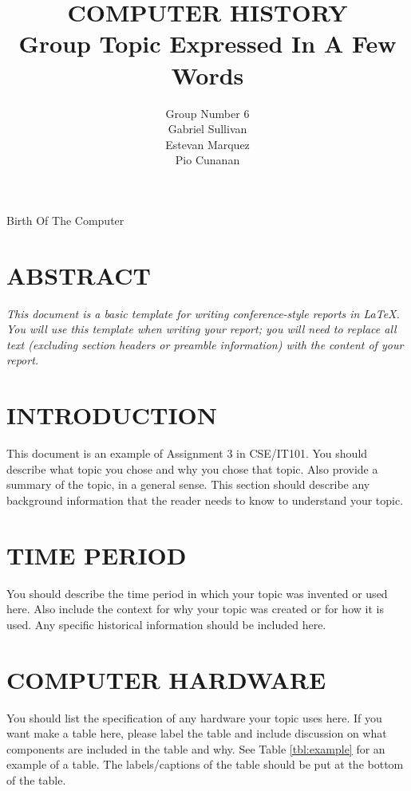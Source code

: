 \documentclass[letterpaper, 10 pt, conference]{IEEEconf}
\title{\LARGE \bf
COMPUTER HISTORY\\
\large Group Topic Expressed In A Few Words
}
\author{Group Number 6\\
\small Gabriel Sullivan\\
\small Estevan Marquez\\
\small Pio Cunanan\\
}
\begin{document}
\maketitle Birth Of The Computer
\thispagestyle{empty}
\pagestyle{empty}


\section*{ABSTRACT}
\textit{
This document is a basic template for writing conference-style
reports in LaTeX. You will use this template when writing
your report; you will need to replace all text (excluding
section headers or preamble information) with the content
of your report.
}

\section{INTRODUCTION}

This document is an example of Assignment 3 in CSE/IT101.
You should describe what topic you chose and
why you chose that topic. Also provide a summary of the
topic, in a general sense. This section should describe any
background information that the reader needs to know to
understand your topic.

\section{TIME PERIOD}

You should describe the time period in which your topic was
invented or used here. Also include the context for why your
topic was created or for how it is used. Any specific historical
information should be included here.

\section{COMPUTER HARDWARE}

You should list the specification of any hardware your topic
uses here. If you want make a table here, please label the table
and include discussion on what components are included in the
table and why. See Table
\ref{tbl:example} for an example of a table.
The labels/captions of the table should be put at the bottom
of the table.
\end{document}
